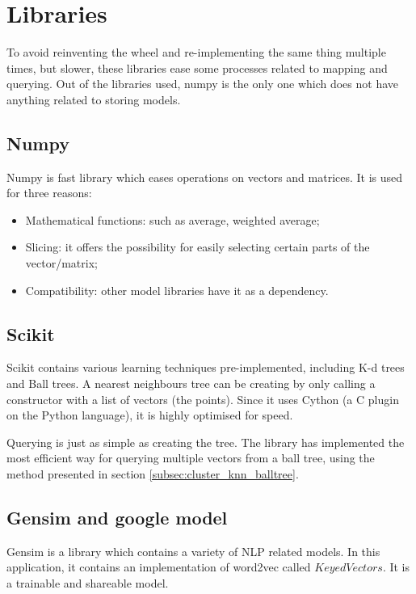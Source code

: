 \section{Libraries}
\label{sec:app_libraries}

To avoid reinventing the wheel and re-implementing the same thing multiple times, but slower, these libraries ease some processes related to mapping and querying. Out of the libraries used, numpy is the only one which does not have anything related to storing models.

\subsection{Numpy}
\label{subsec:app_libraries_numpy}

Numpy is fast library which eases operations on vectors and matrices. It is used for three reasons:

\begin{itemize}
\item{Mathematical functions: such as average, weighted average;}
\item{Slicing: it offers the possibility for easily selecting certain parts of the vector/matrix;}
\item{Compatibility: other model libraries have it as a dependency.}
\end{itemize}

\subsection{Scikit}
\label{subsec:app_libraries_scikit}

Scikit contains various learning techniques pre-implemented, including K-d trees and Ball trees. A nearest neighbours tree can be creating by only calling a constructor with a list of vectors (the points). Since it uses Cython (a C plugin on the Python language), it is highly optimised for speed.

Querying is just as simple as creating the tree. The library has implemented the most efficient way for querying multiple vectors from a ball tree, using the method presented in section \ref{subsec:cluster_knn_balltree}.

\subsection{Gensim and google model}
\label{subsec:app_libraries_gensim}

Gensim is a library which contains a variety of NLP related models. In this application, it contains an implementation of word2vec called $KeyedVectors$. It is a trainable and shareable model.

